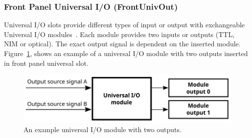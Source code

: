 \documentclass[12pt,a4paper]{article}
\begin{document}
\begin{itemize}
	
\end{itemize}


\subsubsection{Front Panel Universal I/O (FrontUnivOut)}\label{sec:Front Panel Universal I/O}
Universal I/O slots provide different types of input or output with exchangeable Universal I/O modules~\cite{mrf_modules}. Each module provides two inputs or outputs (TTL, NIM or optical). 
The exact output signal is dependent on the inserted module. Figure~\ref{fig:output_univ}, shows an example of a universal I/O module with two outputs inserted in front panel universal slot.
\begin{figure}[H]
	\centering
	\includegraphics[]{./img/univ}
	\caption{An example universal I/O module with two outputs.}
	\label{fig:output_univ}
\end{figure}
\end{document}
